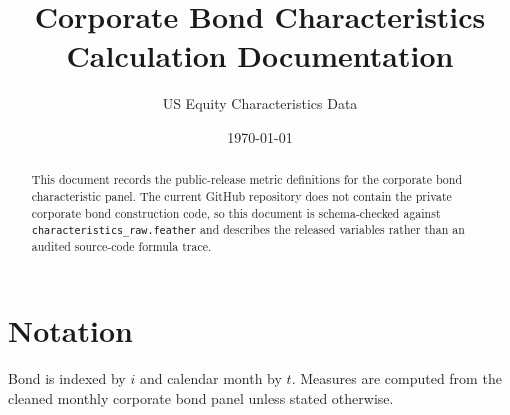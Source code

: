 \documentclass[11pt]{article}
\title{\Large\bfseries Corporate Bond Characteristics Calculation Documentation}
\author{US Equity Characteristics Data}
\date{\today}
\begin{document}
\maketitle

\begin{abstract}
This document records the public-release metric definitions for the corporate
bond characteristic panel. The current GitHub repository does not contain the
private corporate bond construction code, so this document is schema-checked
against \texttt{characteristics\_raw.feather} and describes the released
variables rather than an audited source-code formula trace.
\end{abstract}

\section{Notation}
Bond is indexed by \(i\) and calendar month by \(t\). Measures are computed
from the cleaned monthly corporate bond panel unless stated otherwise.
\end{document}

